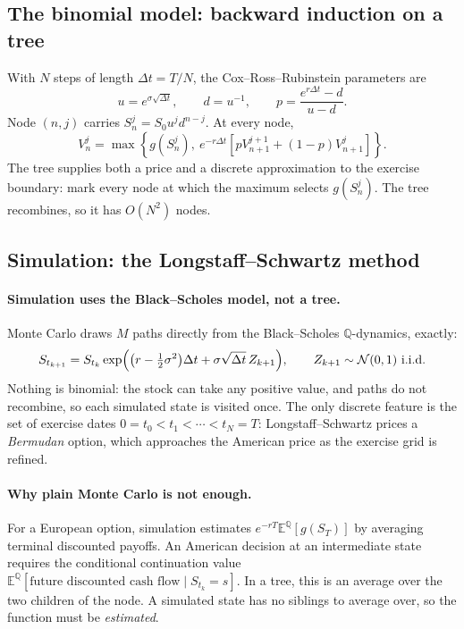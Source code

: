 \documentclass[10pt]{article}
\newcommand{\E}{\mathbb E}
\newcommand{\Q}{\mathbb Q}
\newcommand{\1}{\mathbf 1}
\theoremstyle{definition}
\begin{document}
\subsection{The binomial model: backward induction on a tree}

With \(N\) steps of length \(\Delta t=T/N\), the Cox--Ross--Rubinstein
parameters are
\[
u=e^{\sigma\sqrt{\Delta t}},\qquad d=u^{-1},\qquad
p=\frac{e^{r\Delta t}-d}{u-d}.
\]
Node \((n,j)\) carries \(S_n^j=S_0u^jd^{n-j}\). At every node,
\[
\boxed{V_n^j=\max\left\{g(S_n^j),\ e^{-r\Delta t}
\left[pV_{n+1}^{j+1}+(1-p)V_{n+1}^j\right]\right\}.}
\]
The tree supplies both a price and a discrete approximation to the exercise
boundary: mark every node at which the maximum selects \(g(S_n^j)\). The
tree recombines, so it has \(O(N^2)\) nodes.

\subsection{Simulation: the Longstaff--Schwartz method}

\paragraph{Simulation uses the Black--Scholes model, not a tree.}
Monte Carlo draws \(M\) paths directly from the Black--Scholes
\(\Q\)-dynamics, exactly:
\[
S_{t_{k+1}}=S_{t_k}\exp\Bigl(\bigl(r-\tfrac12\sigma^2\bigr)\Delta t
+\sigma\sqrt{\Delta t}\,Z_{k+1}\Bigr),\qquad Z_{k+1}\sim\mathcal N(0,1)
\text{ i.i.d.}
\]
Nothing is binomial: the stock can take any positive value, and paths do not
recombine, so each simulated state is visited once. The only discrete feature
is the set of exercise dates \(0=t_0<t_1<\cdots<t_N=T\): Longstaff--Schwartz
prices a \emph{Bermudan} option, which approaches the American price as the
exercise grid is refined.

\paragraph{Why plain Monte Carlo is not enough.}
For a European option, simulation estimates \(e^{-rT}\E^\Q[g(S_T)]\) by
averaging terminal discounted payoffs. An American decision at an
intermediate state requires the conditional continuation value
\(\E^\Q[\text{future discounted cash flow}\mid S_{t_k}=s]\). In a tree, this
is an average over the two children of the node. A simulated state has no
siblings to average over, so the function must be \emph{estimated}.
\end{document}
